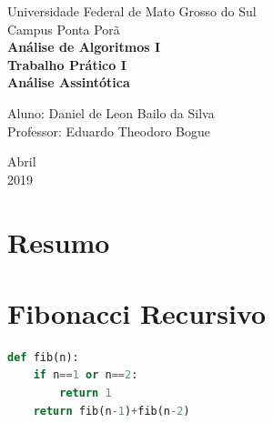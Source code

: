 \documentclass[a4paper, 12pt]{article}
\begin{document}
\begin{titlepage}
    \begin{center}
		\LARGE{Universidade Federal de Mato Grosso do Sul}\\
		\vspace{15pt}
        \large{Campus Ponta Porã}\\ 
        \large{{\textbf{Análise de Algoritmos I}}}\\ 
        \vspace{15pt}
        \vspace{95pt}
        \textbf{\large{Trabalho Prático I}}\\
        \vspace{15pt}
        \textbf{\LARGE{Análise Assintótica}}\\
        \vspace{3,5cm}
    \end{center}
    
    \begin{flushleft}
        \begin{tabbing}
            Aluno: Daniel de Leon Bailo da Silva\\
            Professor: Eduardo Theodoro Bogue\\
    \end{tabbing}
 \end{flushleft}
    \vspace{1cm}
    
    \begin{center}
        \vspace{\fill}
             Abril\\
         2019
            \end{center}
\end{titlepage}

\newpage
\tableofcontents
\thispagestyle{empty}

\newpage
{}
\section{Resumo}
\newpage

\section{Fibonacci Recursivo}

\begin{lstlisting}[language=Python, caption= Código da função do Fibonacci Recursivo]
def fib(n):
	if n==1 or n==2:
		return 1
	return fib(n-1)+fib(n-2)
\end{lstlisting}
\end{document}
